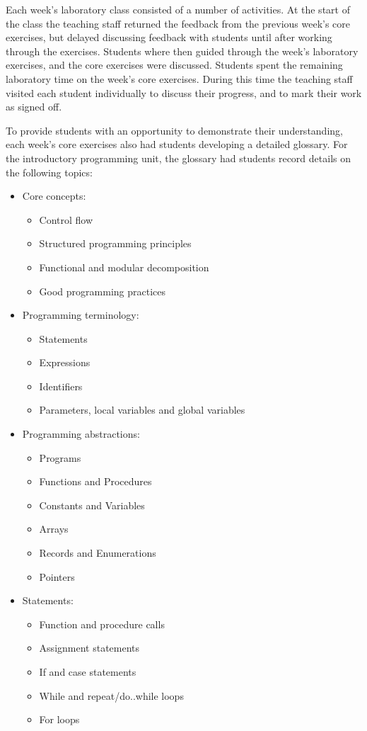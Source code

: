 Each week's laboratory class consisted of a number of activities. At the start of the class the teaching staff returned the feedback from the previous week's core exercises, but delayed discussing feedback with students until after working through the exercises. Students where then guided through the week's laboratory exercises, and the core exercises were discussed. Students spent the remaining laboratory time on the week's core exercises. During this time the teaching staff visited each student individually to discuss their progress, and to mark their work as signed off.

To provide students with an opportunity to demonstrate their understanding, each week's core exercises also had students developing a detailed glossary. For the introductory programming unit, the glossary had students record details on the following topics:
\begin{itemize}[noitemsep, nolistsep]
	\item Core concepts:
	\begin{itemize}[noitemsep, nolistsep]
		\item Control flow
		\item Structured programming principles
		\item Functional and modular decomposition
		\item Good programming practices
	\end{itemize}
	\item Programming terminology:
	\begin{itemize}[noitemsep, nolistsep]
		\item Statements
		\item Expressions
		\item Identifiers
		\item Parameters, local variables and global variables
	\end{itemize}
	\item Programming abstractions:
	\begin{itemize}[noitemsep, nolistsep]
		\item Programs
		\item Functions and Procedures
		\item Constants and Variables
		\item Arrays
		\item Records and Enumerations
		\item Pointers
	\end{itemize}
	\item Statements:
	\begin{itemize}[noitemsep, nolistsep]
		\item Function and procedure calls
		\item Assignment statements
		\item If and case statements
		\item While and repeat/do..while loops
		\item For loops
	\end{itemize}
\end{itemize}

